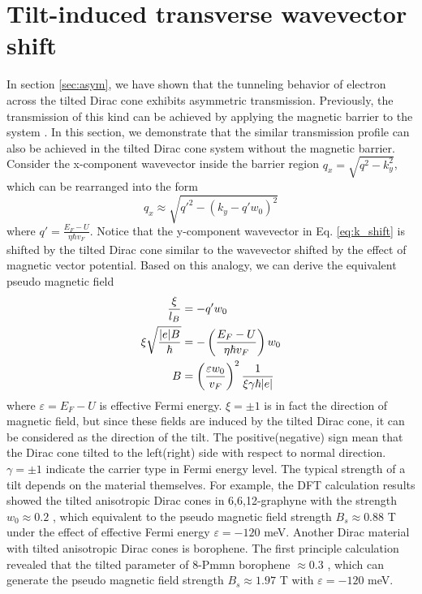 \section{Tilt-induced transverse wavevector shift} \label{sec:pseudo b}
    In section \ref{sec:asym}, we have shown that the tunneling behavior of electron across the tilted Dirac cone exhibits asymmetric transmission. 
    Previously, the transmission of this kind can be achieved by applying the magnetic barrier to the system \cite{RamezaniMasir2008,RamezaniMasir2010}.
    In this section, we demonstrate that the similar transmission profile can also be achieved in the tilted Dirac cone system without the magnetic barrier.
    Consider the x-component wavevector inside the barrier region $q_x = \sqrt{q^2-k_y^2}$, which can be rearranged into the form
    \begin{equation} \label{eq:k_shift}
        q_x \approx \sqrt{q'^2 -(k_y-q'w_0)^2}
    \end{equation} 
    where $q' = \frac{E_F-U}{\eta \hbar v_F}$. 
    Notice that the y-component wavevector in Eq. \ref{eq:k_shift} is shifted by the tilted Dirac cone similar to the wavevector shifted by the effect of magnetic vector potential.
    Based on this analogy, we can derive the equivalent pseudo magnetic field
    \begin{align} \label{eq:pseudo B}
        \frac{\xi}{l_B} &= -q' w_0 \notag \\
        \xi\sqrt{\frac{|e| B}{\hbar}} &=  -\left(\frac{E_F-U}{\eta \hbar v_F}\right) w_0\notag \\
        B &= \left(\frac{\varepsilon w_0}{v_F}\right)^2 \frac{1}{\xi \gamma \hbar |e|}
    \end{align}
    where $\varepsilon = E_F-U$ is effective Fermi energy. 
    $\xi = \pm 1$ is in fact the direction of magnetic field, but since these fields are induced by the tilted Dirac cone, it can be considered as the direction of the tilt.
    The positive(negative) sign mean that the Dirac cone tilted to the left(right) side with respect to normal direction. 
    $\gamma = \pm 1$ indicate the carrier type in Fermi energy level.
    The typical strength of a tilt depends on the material themselves. 
    For example, the DFT calculation results showed the tilted anisotropic Dirac cones in 6,6,12-graphyne with the strength $w_0 \approx 0.2$ \cite{Malko2012,Wang2015b}, 
    which equivalent to the pseudo magnetic field strength $B_s \approx 0.88$ T under the effect of effective Fermi energy $\varepsilon = -120$ meV. 
    Another Dirac material with tilted anisotropic Dirac cones is borophene. The first principle calculation revealed that the tilted parameter of 8-Pmmn borophene $\approx 0.3$ \cite{Cheng2017a}, 
    which can generate the pseudo magnetic field strength $B_s \approx 1.97$ T with $\varepsilon = -120$ meV. 

